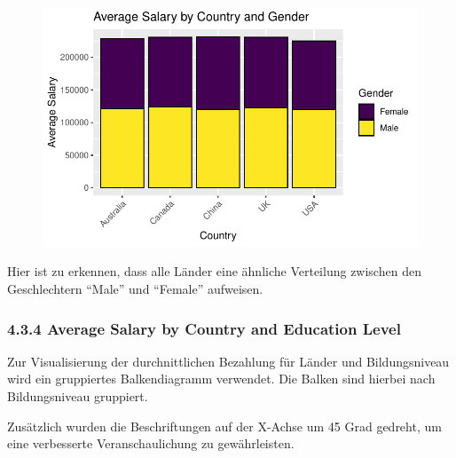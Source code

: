 \documentclass[
  letterpaper,
  DIV=11,
  numbers=noendperiod]{scrartcl}
\begin{document}
\begin{figure}[H]

{\centering \includegraphics{main_doc_files/figure-pdf/unnamed-chunk-32-1.pdf}

}

\end{figure}

Hier ist zu erkennen, dass alle Länder eine ähnliche Verteilung zwischen
den Geschlechtern ``Male'' und ``Female'' aufweisen.

\hypertarget{average-salary-by-country-and-education-level}{%
\subsubsection{4.3.4 Average Salary by Country and Education
Level}\label{average-salary-by-country-and-education-level}}

Zur Visualisierung der durchnittlichen Bezahlung für Länder und
Bildungsniveau wird ein gruppiertes Balkendiagramm verwendet. Die Balken
sind hierbei nach Bildungsniveau gruppiert.

Zusätzlich wurden die Beschriftungen auf der X-Achse um 45 Grad gedreht,
um eine verbesserte Veranschaulichung zu gewährleisten.
\end{document}
